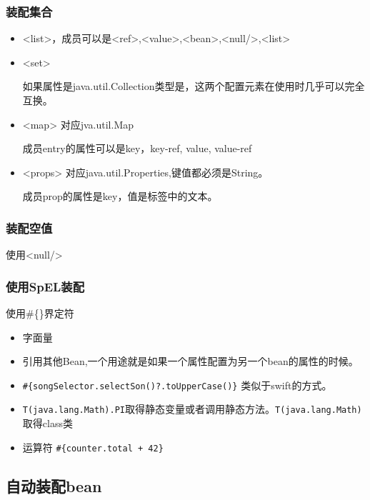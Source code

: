 \subsubsection{装配集合}

\begin{itemize}
\item <list>，成员可以是<ref>,<value>,<bean>,<null/>,<list> 
\item <set>

如果属性是java.util.Collection类型是，这两个配置元素在使用时几乎可以完全互换。

\item <map> 对应jva.util.Map

成员entry的属性可以是key，key-ref, value, value-ref

\item <props> 对应java.util.Properties,键值都必须是String。

成员prop的属性是key，值是标签中的文本。

\end{itemize}

\subsubsection{装配空值}

使用<null/>

\subsubsection{使用SpEL装配}

使用\#\{\}界定符

\begin{itemize}
\item 字面量
\item 引用其他Bean,一个用途就是如果一个属性配置为另一个bean的属性的时候。

\item \lstinline$#{songSelector.selectSon()?.toUpperCase()}$ 类似于swift的方式。

\item \lstinline$T(java.lang.Math).PI$取得静态变量或者调用静态方法。\lstinline$T(java.lang.Math)$取得class类

\item 运算符 \lstinline$#{counter.total + 42}$


\end{itemize}

\subsection{自动装配bean}

